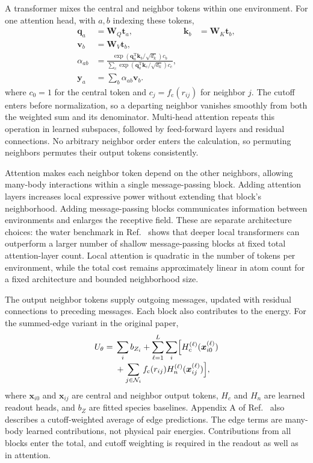 \documentclass[10pt,a4paper,twocolumn]{article}
\begin{document}
A transformer mixes the central and neighbor tokens within one environment.
For one attention head, with $a,b$ indexing these tokens,
\begin{align}
  \bm q_a&=\bm W_Q\bm t_a,
  &\bm k_b&=\bm W_K\bm t_b,
  \\
  \bm v_b&=\bm W_V\bm t_b,
  \\
  \alpha_{ab}
    &=\frac{\exp(\bm q_a^{\mathrm T}\bm k_b/\sqrt{d_k})
                    c_b}
            {\sum_c\exp(\bm q_a^{\mathrm T}\bm k_c/\sqrt{d_k})
                    c_c},
  \\
  \bm y_a&=\sum_b\alpha_{ab}\bm v_b.
  \label{eq:self-attention}
\end{align}
where $c_0=1$ for the central token and $c_j=f_{\mathrm c}(r_{ij})$ for
neighbor $j$. The cutoff enters before normalization, so a departing neighbor
vanishes smoothly from both the weighted sum and its denominator.
Multi-head attention repeats this operation in learned subspaces, followed
by feed-forward layers and residual connections. No arbitrary neighbor order
enters the calculation, so permuting neighbors permutes their output tokens
consistently.

Attention makes each neighbor token depend on the other neighbors, allowing
many-body interactions within a single message-passing block. Adding
attention layers increases local expressive power without extending that
block's neighborhood. Adding message-passing blocks communicates information
between environments and enlarges the receptive field. These are separate
architecture choices: the water benchmark in Ref.~\cite{pet} shows that
deeper local transformers can outperform a larger number of shallow
message-passing blocks at fixed total attention-layer count. Local attention
is quadratic in the number of tokens per environment, while the total cost
remains approximately linear in atom count for a fixed architecture and
bounded neighborhood size.

The output neighbor tokens supply outgoing messages, updated with residual
connections to preceding messages. Each block also contributes to the energy.
For the summed-edge variant in the original paper,
\begin{equation}
  \begin{aligned}
  U_\theta={}&\sum_i b_{Z_i}
  +\sum_{\ell=1}^{L}\sum_i\Bigl[
      H_c^{(\ell)}(\bm x_{i0}^{(\ell)})
  \\[-0.2em]
  &+\sum_{j\in\mathcal N_i}f_{\mathrm c}(r_{ij})
                 H_n^{(\ell)}(\bm x_{ij}^{(\ell)})\Bigr],
  \end{aligned}
  \label{eq:pet-readout}
\end{equation}
where $\bm x_{i0}$ and $\bm x_{ij}$ are central and neighbor output tokens,
$H_c$ and $H_n$ are learned readout heads, and $b_Z$ are fitted species
baselines. Appendix A of Ref.~\cite{pet} also describes a cutoff-weighted
average of edge predictions. The edge terms are many-body learned
contributions, not physical pair energies. Contributions from all blocks
enter the total, and cutoff weighting is required in the readout as well as
in attention.
\end{document}

